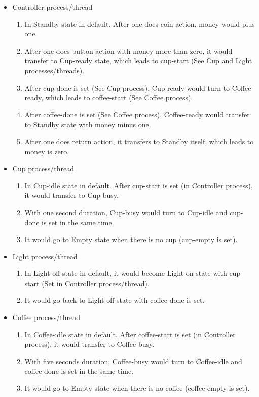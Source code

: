 \documentclass[a4paper]{article}
\begin{document}
\begin{itemize}
	\item Controller process/thread\\
		\begin{enumerate}
			\item In Standby state in default. After one does coin action, money would plus one.
			\item After one does button action with money more than zero, it would transfer
				to Cup-ready state, which leads to cup-start (See Cup and Light processes/threads).
			\item After cup-done is set (See Cup process), Cup-ready would turn to Coffee-ready, which leads
				to coffee-start (See Coffee process).
			\item After coffee-done is set (See Coffee process), Coffee-ready would transfer to Standby
				state with money minus one.
			\item After one does return action, it transfers to Standby itself, which leads to money is zero.
		\end{enumerate}
	\item Cup process/thread\\
		\begin{enumerate}
			\item In Cup-idle state in default. After cup-start is set (in Controller process), it would transfer
				to Cup-busy.
			\item With one second duration, Cup-busy would turn to Cup-idle and cup-done is set in the same time.
			\item It would go to Empty state when there is no cup (cup-empty is set).
		\end{enumerate}
	\item Light process/thread\\
		\begin{enumerate}
			\item In Light-off state in default, it would become Light-on state with cup-start (Set in Controller process/thread).
			\item It would go back to Light-off state with coffee-done is set.
			\end{enumerate}
	\item Coffee process/thread\\
		\begin{enumerate}
			\item In Coffee-idle state in default. After coffee-start is set (in Controller process), it would transfer
				to Coffee-busy.
			\item With five seconds duration, Coffee-busy would turn to Coffee-idle and coffee-done is set in the same time.
			\item It would go to Empty state when there is no coffee (coffee-empty is set).
		\end{enumerate}
\end{itemize}
\end{document}
